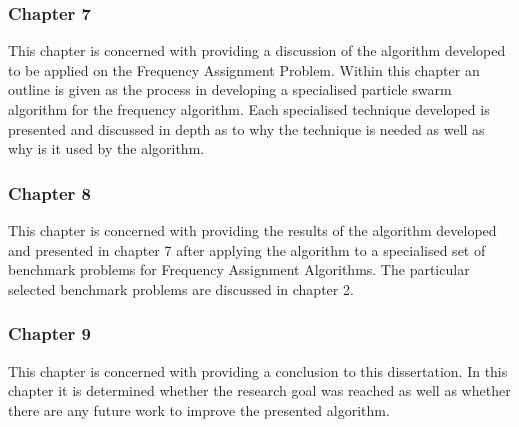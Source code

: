 \subsubsection{Chapter 7}
This chapter is concerned with providing a discussion of the algorithm developed to be applied on the Frequency Assignment Problem. Within this chapter an outline is given as the process in developing a specialised particle swarm algorithm for the frequency algorithm. Each specialised technique developed is presented and discussed in depth as to why the technique is needed as well as why is it used by the algorithm.
\subsubsection{Chapter 8}
This chapter is concerned with providing the results of the algorithm developed and presented in chapter 7 after applying the algorithm to a specialised set of benchmark problems for Frequency Assignment Algorithms. The particular selected benchmark problems are discussed in chapter 2.
\subsubsection{Chapter 9}
This chapter is concerned with providing a conclusion to this dissertation. In this chapter it is determined whether the research goal was reached as well as whether there are any future work to improve the presented algorithm.
